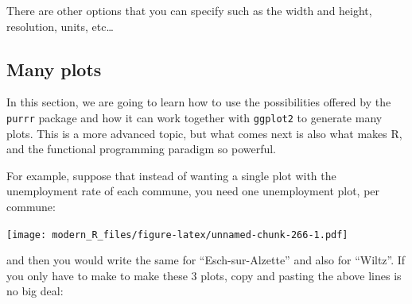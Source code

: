 \documentclass[]{gitbook}
\newenvironment{Shaded}{\begin{snugshade}}{\end{snugshade}}
\newcommand{\DataTypeTok}[1]{\textcolor[rgb]{0.13,0.29,0.53}{#1}}
\newcommand{\KeywordTok}[1]{\textcolor[rgb]{0.13,0.29,0.53}{\textbf{#1}}}
\newcommand{\NormalTok}[1]{#1}
\newcommand{\OperatorTok}[1]{\textcolor[rgb]{0.81,0.36,0.00}{\textbf{#1}}}
\newcommand{\StringTok}[1]{\textcolor[rgb]{0.31,0.60,0.02}{#1}}
\theoremstyle{definition}
\theoremstyle{definition}
\theoremstyle{definition}
\theoremstyle{remark}
\begin{document}
There are other options that you can specify such as the width and
height, resolution, units, etc\ldots{}

\hypertarget{many-plots}{%
\subsection{Many plots}\label{many-plots}}

In this section, we are going to learn how to use the possibilities
offered by the \texttt{purrr} package and how it can work together with
\texttt{ggplot2} to generate many plots. This is a more advanced topic,
but what comes next is also what makes R, and the functional programming
paradigm so powerful.

For example, suppose that instead of wanting a single plot with the
unemployment rate of each commune, you need one unemployment plot, per
commune:

\begin{Shaded}
\end{Shaded}

\texttt{[image: modern\_R\_files/figure-latex/unnamed-chunk-266-1.pdf]}

and then you would write the same for ``Esch-sur-Alzette'' and also for
``Wiltz''. If you only have to make to make these 3 plots, copy and
pasting the above lines is no big deal:

\begin{Shaded}
\end{Shaded}
\end{document}
